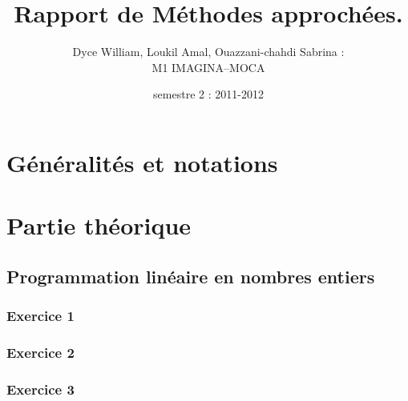\documentclass[a4paper, 12pt]{article}
\title{Rapport de Méthodes approchées.}
\author{Dyce William, Loukil Amal, Ouazzani-chahdi Sabrina : \\ M1 IMAGINA--MOCA}
\date{semestre 2 : 2011-2012}
\begin{document}
 

\maketitle



\pagebreak

\tableofcontents

\pagebreak

\listoffigures
\listoftables

\pagebreak

\section{Généralités et notations}


\pagebreak

\section{Partie théorique}

\subsection{Programmation linéaire en nombres entiers}

\subsubsection*{Exercice 1}


\subsubsection*{Exercice 2}


\subsubsection*{Exercice 3}

\end{document}
